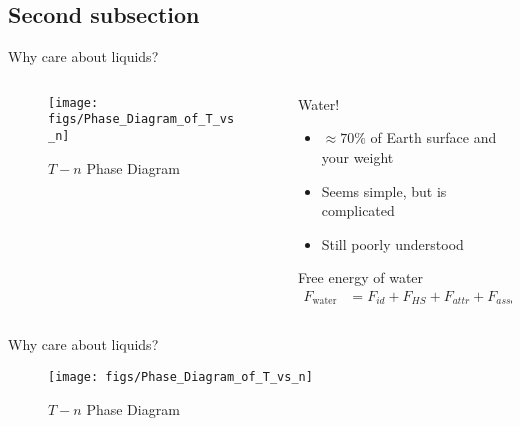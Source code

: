\documentclass{beamer}
\begin{document}
\subsection*{Second subsection}
\begin{frame}{Why care about liquids?}
    \begin{columns}[t]
        \begin{column}{.5\textwidth}
            \begin{figure}
                \centering
                \texttt{[image: figs/Phase\_Diagram\_of\_T\_vs\_n]}
                \caption{$T-n$ Phase Diagram}
                \label{fig:Phase_Diagram_of_T_vs_n}
            \end{figure}
        \end{column}
        \begin{column}{.5\textwidth}
            \begin{block}{Water!}
            \begin{itemize}
                \item $\approx 70\%$ of Earth surface and your weight
                \item Seems simple, but is complicated
                \item Still poorly understood 
            \end{itemize}
            \end{block}
            \begin{block}{Free energy of water}
                \begin{align*}
                    F_{\text{water}} &= F_{id} + F_{HS} + F_{attr} + F_{assoc} 
                \end{align*}
            \end{block}
        \end{column}
    \end{columns}
\end{frame}

\begin{frame}{Why care about liquids?}
    \begin{figure}
        \centering
        \texttt{[image: figs/Phase\_Diagram\_of\_T\_vs\_n]}
        \caption{$T-n$ Phase Diagram}
        \label{fig:Phase_Diagram_of_T_vs_n}
    \end{figure}
\end{frame}
\end{document}
